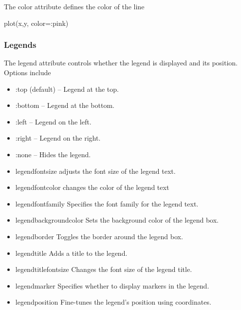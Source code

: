 \documentclass{report}
\begin{document}
     \bigbreak \noindent 
     The color attribute defines the color of the line
     \bigbreak \noindent 
     \begin{jlcode}
     plot(x,y, color=:pink)
     \end{jlcode}

     \bigbreak \noindent 
     \subsubsection{Legends}
     \bigbreak \noindent 
     The legend attribute controls whether the legend is displayed and its position. Options include
     \begin{itemize}
         \item :top (default) – Legend at the top.
         \item :bottom – Legend at the bottom.
         \item :left – Legend on the left.
         \item :right – Legend on the right.
         \item :none – Hides the legend.
     \end{itemize}
     \bigbreak \noindent 
     \begin{itemize}
         \item legendfontsize adjusts the font size of the legend text. 
         \item legendfontcolor changes the color of the legend text
         \item legendfontfamily Specifies the font family for the legend text.
         \item legendbackgroundcolor Sets the background color of the legend box.
         \item legendborder Toggles the border around the legend box.
         \item legendtitle Adds a title to the legend.
         \item legendtitlefontsize Changes the font size of the legend title.
         \item legendmarker Specifies whether to display markers in the legend.
         \item legendposition Fine-tunes the legend's position using coordinates.
     \end{itemize}
     \bigbreak \noindent 
\end{document}
